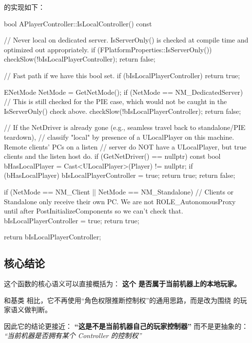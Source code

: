  的实现如下：

\begin{code}
	bool APlayerController::IsLocalController() const
	{
		// Never local on dedicated server. IsServerOnly() is checked at compile time and optimized out appropriately.
		if (FPlatformProperties::IsServerOnly())
		{
			checkSlow(!bIsLocalPlayerController);
			return false;
		}
		
		// Fast path if we have this bool set.
		if (bIsLocalPlayerController)
		{
			return true;
		}
		
		ENetMode NetMode = GetNetMode();
		if (NetMode == NM_DedicatedServer)
		{
			// This is still checked for the PIE case, which would not be caught in the IsServerOnly() check above.
			checkSlow(!bIsLocalPlayerController);
			return false;
		}
		
		// If the NetDriver is already gone (e.g., seamless travel back to standalone/PIE teardown),
		// classify "local" by presence of a ULocalPlayer on this machine. Remote clients' PCs on a listen
		// server do NOT have a ULocalPlayer, but true clients and the listen host do.
		if (GetNetDriver() == nullptr)
		{
			const bool bHasLocalPlayer = Cast<ULocalPlayer>(Player) != nullptr;
			if (bHasLocalPlayer)
			{
				bIsLocalPlayerController = true;
				return true;
			}
			return false;
		}
		
		if (NetMode == NM_Client || NetMode == NM_Standalone)
		{
			// Clients or Standalone only receive their own PC. We are not ROLE_AutonomousProxy until after PostInitializeComponents so we can't check that.
			bIsLocalPlayerController = true;
			return true;
		}
		
		return bIsLocalPlayerController;
	}
\end{code}

\subsection{核心结论}

这个函数的核心语义可以直接概括为：
\textbf{这个  是否属于当前机器上的本地玩家。}

和基类  相比，它不再使用“角色权限推断控制权”的通用思路，而是改为围绕  的玩家语义做判断。

因此它的结论更接近：
\textbf{“这是不是当前机器自己的玩家控制器”}
而不是更抽象的：	\emph{“当前机器是否拥有某个 Controller 的控制权”}

